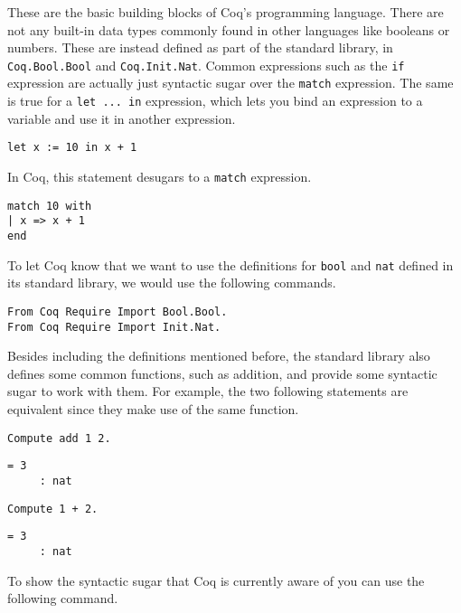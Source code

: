 These are the basic building blocks of Coq's programming language. There are not any built-in data 
types commonly found in other languages like booleans or numbers. These are instead defined as part of 
the standard library, in \texttt{Coq.Bool.Bool} and \texttt{Coq.Init.Nat}. Common 
expressions such as the \texttt{if} expression are actually just syntactic sugar over the
\texttt{match} expression. The same is true for a \texttt{let ... in} expression, 
which lets you bind an expression to a variable and use it in another expression.
\begin{verbatim}
let x := 10 in x + 1
\end{verbatim}
\noindent In Coq, this statement desugars to a \texttt{match} expression.
\begin{verbatim}
match 10 with
| x => x + 1
end
\end{verbatim}

To let Coq know that we want to use the definitions for \texttt{bool} and 
\texttt{nat} defined in its standard library, we would use the following commands.

\begin{verbatim}
From Coq Require Import Bool.Bool.
From Coq Require Import Init.Nat.
\end{verbatim}

Besides including the definitions mentioned before, the standard library also defines some
common functions, such as addition, and provide some syntactic sugar to work with them. For example, 
the two following statements are equivalent since they make use of the same function.

\begin{verbatim}
Compute add 1 2.
\end{verbatim}
\vspace{-\baselineskip*3/2}
\begin{verbatim}
= 3
     : nat
\end{verbatim}
\vspace{-\baselineskip*3/2}
\begin{verbatim}
Compute 1 + 2.
\end{verbatim}
\vspace{-\baselineskip*3/2}
\begin{verbatim}
= 3
     : nat
\end{verbatim}

To show the syntactic sugar that Coq is currently aware of you can use the following command. 

